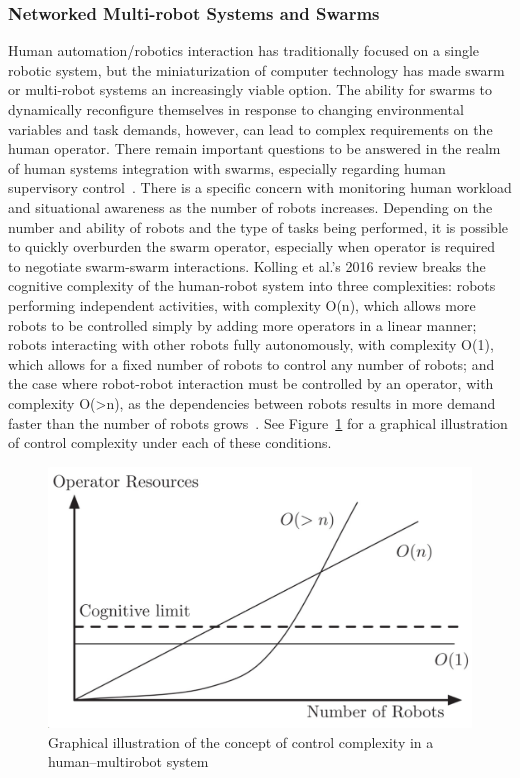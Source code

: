 \subsubsection{Networked Multi-robot Systems and Swarms}
Human automation/robotics interaction has traditionally focused on a single robotic system, but the miniaturization of computer technology has made swarm or multi-robot systems an increasingly viable option.
The ability for swarms to dynamically reconfigure themselves in response to changing environmental variables and task demands, however, can lead to complex requirements on the human operator.
There remain important questions to be answered in the realm of human systems integration with swarms, especially regarding human supervisory control~\citep{kolling_human_2016}.
There is a specific concern with monitoring human workload and situational awareness as the number of robots increases.
Depending on the number and ability of robots and the type of tasks being performed, it is possible to quickly overburden the swarm operator, especially when operator is required to negotiate swarm-swarm interactions.
Kolling et al.'s 2016 review breaks the cognitive complexity of the human-robot system into three complexities: robots performing independent activities, with complexity O(n), which allows more robots to be controlled simply by adding more operators in a linear manner; robots interacting with other robots fully autonomously, with complexity O(1), which allows for a fixed number of robots to control any number of robots; and the case where robot-robot interaction must be controlled by an operator, with complexity O(>n), as the dependencies between robots results in more demand faster than the number of robots grows~\citep{kolling_human_2016}.
See Figure~\ref{figure-hari:controlcomplexity} for a graphical illustration of control complexity under each of these conditions.

\begin{figure}[b!]
    \begin{center}
        \includegraphics[width=0.8\linewidth]{figures/TradeStudy/figure2.png}
        \caption{Graphical illustration of the concept of control complexity in a human–multirobot system~\citep{kolling_human_2016}}
        \label{figure-hari:controlcomplexity}
    \end{center}
\end{figure}

